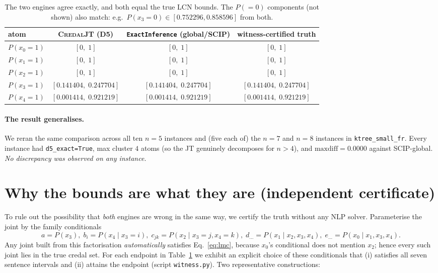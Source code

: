 \documentclass[11pt]{article}
\begin{document}
\begin{table}[h]
\centering
\begin{tabular}{lccc}
\toprule
atom & \textsc{CredalJT} (D5) & \texttt{ExactInference} (global/SCIP) & witness-certified truth\\
\midrule
$P(x_0{=}1)$ & $[0,\;1]$ & $[0,\;1]$ & $[0,\;1]$\\
$P(x_1{=}1)$ & $[0,\;1]$ & $[0,\;1]$ & $[0,\;1]$\\
$P(x_2{=}1)$ & $[0,\;1]$ & $[0,\;1]$ & $[0,\;1]$\\
$P(x_3{=}1)$ & $[0.141404,\;0.247704]$ & $[0.141404,\;0.247704]$ & $[0.141404,\;0.247704]$\\
$P(x_4{=}1)$ & $[0.001414,\;0.921219]$ & $[0.001414,\;0.921219]$ & $[0.001414,\;0.921219]$\\
\bottomrule
\end{tabular}
\caption{The two engines agree exactly, and both equal the true LCN bounds.
The $P({=}0)$ components (not shown) also match: e.g.\ $P(x_3{=}0)\in
[0.752296,0.858596]$ from both.}
\label{tab:results}
\end{table}

\paragraph{The result generalises.} We reran the same comparison across all ten
$n{=}5$ instances and (five each of) the $n{=}7$ and $n{=}8$ instances in
\texttt{ktree\_small\_fr}. Every instance had \texttt{d5\_exact=True}, max
cluster $4$ atoms (so the JT genuinely decomposes for $n>4$), and
$\text{maxdiff}=0.0000$ against SCIP-global. \emph{No discrepancy was observed
on any instance.}

\section{Why the bounds are what they are (independent certificate)}
\label{sec:witness}

To rule out the possibility that \emph{both} engines are wrong in the same way,
we certify the truth without any NLP solver. Parameterise the joint by the
family conditionals
\[
a=P(x_3),\; b_i=P(x_4\mid x_3{=}i),\; c_{jk}=P(x_2\mid x_3{=}j,x_4{=}k),\;
d_{\dots}=P(x_1\mid x_2,x_3,x_4),\; e_{\dots}=P(x_0\mid x_1,x_3,x_4).
\]
Any joint built from this factorisation \emph{automatically} satisfies
Eq.~\eqref{eq:lmc}, because $x_0$'s conditional does not mention $x_2$; hence
every such joint lies in the true credal set. For each endpoint in
Table~\ref{tab:results} we exhibit an explicit choice of these conditionals that
(i) satisfies all seven sentence intervals and (ii) attains the endpoint
(script \texttt{witness.py}). Two representative constructions:
\end{document}
